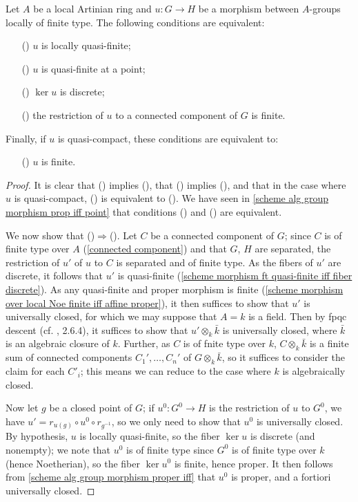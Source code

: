 \begin{corollary}\label{scheme alg group morphism local qf iff}
Let $A$ be a local Artinian ring and $u:G\to H$ be a morphism between $A$-groups locally of finite type. The following conditions are equivalent:
\begin{enumerate}
    \item[(\rmnum{1})] $u$ is locally quasi-finite;
    \item[(\rmnum{2})] $u$ is quasi-finite at a point;
    \item[(\rmnum{3})] $\ker u$ is discrete;
    \item[(\rmnum{4})] the restriction of $u$ to a connected component of $G$ is finite.    
\end{enumerate}
Finally, if $u$ is quasi-compact, these conditions are equivalent to:
\begin{enumerate}
    \item[(\rmnum{5})] $u$ is finite.
\end{enumerate}
\end{corollary}
\begin{proof}
It is clear that () implies (), that () implies (), and that in the case where $u$ is quasi-compact, () is equivalent to (). We have seen in \cref{scheme alg group morphism prop iff point} that conditions () and () are equivalent.\par
We now show that ()$\Rightarrow$(). Let $C$ be a connected component of $G$; since $C$ is of finite type over $A$ (\cref{connected component}) and that $G$, $H$ are separated, the restriction of $u'$ of $u$ to $C$ is separated and of finite type. As the fibers of $u'$ are discrete, it follows that $u'$ is quasi-finite (\cref{scheme morphism ft quasi-finite iff fiber discrete}). As any quasi-finite and proper morphism is finite (\cref{scheme morphism over local Noe finite iff affine proper}), it then suffices to show that $u'$ is universally closed, for which we may suppose that $A=k$ is a field. Then by fpqc descent (cf. \cite{EGA4-2}, 2.6.4), it suffices to show that $u'\otimes_k\bar{k}$ is universally closed, where $\bar{k}$ is an algebraic closure of $k$. Further, as $C$ is of fnite type over $k$, $C\otimes_k\bar{k}$ is a finite sum of connected components $C_1',\dots,C_n'$ of $G\otimes_k\bar{k}$, so it suffices to consider the claim for each $C'_i$; this means we can reduce to the case where $k$ is algebraically closed.\par
Now let $g$ be a closed point of $G$; if $u^0:G^0\to H$ is the restriction of $u$ to $G^0$, we have $u'=r_{u(g)}\circ u^0\circ r_{g^{-1}}$, so we only need to show that $u^0$ is universally closed. By hypothesis, $u$ is locally quasi-finite, so the fiber $\ker u$ is discrete (and nonempty); we note that $u^0$ is of finite type since $G^0$ is of finite type over $k$ (hence Noetherian), so the fiber $\ker u^0$ is finite, hence proper. It then follows from \cref{scheme alg group morphism proper iff} that $u^0$ is proper, and a fortiori universally closed.
\end{proof}


